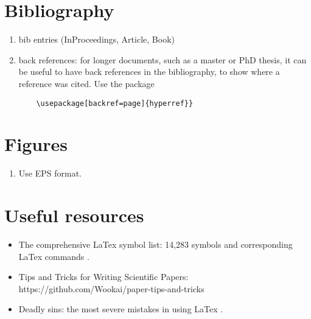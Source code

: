 \documentclass{article}
\begin{document}
\section{Bibliography}
\begin{enumerate}
    \item bib entries (InProceedings, Article, Book)
    \item back references: for longer documents, such as a master or PhD thesis, it can be useful to have back references in the bibliography, to show where a reference was cited. Use the package 
    \begin{lstlisting}
    \usepackage[backref=page]{hyperref}}
    \end{lstlisting}
\end{enumerate}
\section{Figures}

\begin{enumerate}
    \item Use EPS format. 
\end{enumerate}{}

\section{Useful resources}

\begin{itemize}
    \item The comprehensive LaTex symbol list: 14,283 symbols and corresponding LaTex commands \cite{SymbolList}. 
    \item Tips and Tricks for Writing Scientific Papers: https://github.com/Wookai/paper-tips-and-tricks
    \item Deadly sins: the most severe mistakes in using LaTex \cite{Obsolete}.
\end{itemize}{}

\printbibliography
\end{document}
